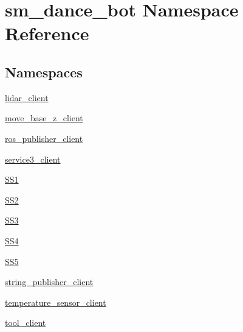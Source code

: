 \hypertarget{namespacesm__dance__bot}{}\section{sm\+\_\+dance\+\_\+bot Namespace Reference}
\label{namespacesm__dance__bot}
\subsection*{Namespaces}
\begin{DoxyCompactItemize}
\item 
 \hyperlink{namespacesm__dance__bot_1_1lidar__client}{lidar\+\_\+client}
\item 
 \hyperlink{namespacesm__dance__bot_1_1move__base__z__client}{move\+\_\+base\+\_\+z\+\_\+client}
\item 
 \hyperlink{namespacesm__dance__bot_1_1ros__publisher__client}{ros\+\_\+publisher\+\_\+client}
\item 
 \hyperlink{namespacesm__dance__bot_1_1service3__client}{service3\+\_\+client}
\item 
 \hyperlink{namespacesm__dance__bot_1_1SS1}{S\+S1}
\item 
 \hyperlink{namespacesm__dance__bot_1_1SS2}{S\+S2}
\item 
 \hyperlink{namespacesm__dance__bot_1_1SS3}{S\+S3}
\item 
 \hyperlink{namespacesm__dance__bot_1_1SS4}{S\+S4}
\item 
 \hyperlink{namespacesm__dance__bot_1_1SS5}{S\+S5}
\item 
 \hyperlink{namespacesm__dance__bot_1_1string__publisher__client}{string\+\_\+publisher\+\_\+client}
\item 
 \hyperlink{namespacesm__dance__bot_1_1temperature__sensor__client}{temperature\+\_\+sensor\+\_\+client}
\item 
 \hyperlink{namespacesm__dance__bot_1_1tool__client}{tool\+\_\+client}
\end{DoxyCompactItemize}

